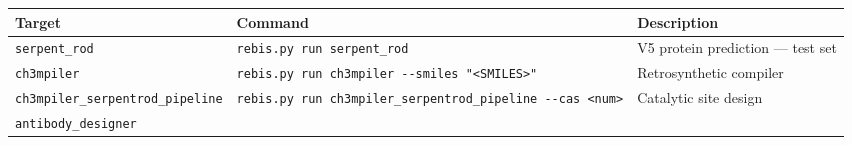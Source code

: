 \begin{longtable}[]{@{}lll@{}}
\toprule
\begin{minipage}[b]{0.24\columnwidth}\raggedright
Target\strut
\end{minipage} & \begin{minipage}[b]{0.27\columnwidth}\raggedright
Command\strut
\end{minipage} & \begin{minipage}[b]{0.40\columnwidth}\raggedright
Description\strut
\end{minipage}\tabularnewline
\midrule
\endhead
\begin{minipage}[t]{0.24\columnwidth}\raggedright
\texttt{serpent\_rod}\strut
\end{minipage} & \begin{minipage}[t]{0.27\columnwidth}\raggedright
\texttt{rebis.py\ run\ serpent\_rod}\strut
\end{minipage} & \begin{minipage}[t]{0.40\columnwidth}\raggedright
V5 protein prediction --- test set\strut
\end{minipage}\tabularnewline
\begin{minipage}[t]{0.24\columnwidth}\raggedright
\texttt{ch3mpiler}\strut
\end{minipage} & \begin{minipage}[t]{0.27\columnwidth}\raggedright
\texttt{rebis.py\ run\ ch3mpiler\ -\/-smiles\ "\textless{}SMILES\textgreater{}"}\strut
\end{minipage} & \begin{minipage}[t]{0.40\columnwidth}\raggedright
Retrosynthetic compiler\strut
\end{minipage}\tabularnewline
\begin{minipage}[t]{0.24\columnwidth}\raggedright
\texttt{ch3mpiler\_serpentrod\_pipeline}\strut
\end{minipage} & \begin{minipage}[t]{0.27\columnwidth}\raggedright
\texttt{rebis.py\ run\ ch3mpiler\_serpentrod\_pipeline\ -\/-cas\ \textless{}num\textgreater{}}\strut
\end{minipage} & \begin{minipage}[t]{0.40\columnwidth}\raggedright
Catalytic site design\strut
\end{minipage}\tabularnewline
\begin{minipage}[t]{0.24\columnwidth}\raggedright
\texttt{antibody\_designer}\strut
\end{minipage} & \begin{minipage}[t]{0.27\columnwidth}\raggedright

\end{minipage}
\end{longtable}
